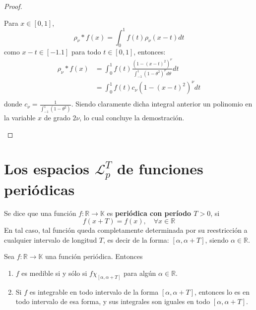 \documentclass[12pt]{report}
\theoremstyle{largebreak}
\newcommand\cf[3]{\ensuremath{#1:#2\rightarrow#3}}
\begin{document}
\begin{proof}
\begin{enumerate}
            Para $x\in[0,1]$,
            \begin{equation*}
                \rho_\nu*f(x)=\int_0^1f(t)\rho_\nu(x-t)dt
            \end{equation*}
            como $x-t\in[-1.1]$ para todo $t\in[0,1]$, entonces:
            \begin{equation*}
                \begin{split}
                    \rho_\nu*f(x)&=\int_0^1f(t)\frac{(1-(x-t)^2)^\nu}{\int_{-1}^1(1-\theta^2)^\nu d\theta}dt\\
                    &=\int_0^1f(t)c_\nu(1-(x-t)^2)^\nu dt\\
                \end{split}
            \end{equation*}
            donde $c_\nu=\frac{1}{\int_{-1}^1(1-\theta^2)}$. Siendo claramente dicha integral anterior un polinomio en la variable $x$ de grado $2\nu$, lo cual concluye la demostración.
        \end{enumerate}
    \end{proof}

    \section{Los espacios $\mathcal{L}_p^T$ de funciones periódicas}

    \begin{mydef}
        Se dice que una función $\cf{f}{\mathbb{R}}{\mathbb{K}}$ es \textbf{periódica con período $T>0$}, si
        \begin{equation*}
            f(x+T)=f(x),\quad\forall x\in\mathbb{R}
        \end{equation*}
        En tal caso, tal función queda completamente determinada por su reestricción a cualquier intervalo de longitud $T$, es decir de la forma: $\left[\alpha,\alpha+T \right]$, siendo $\alpha\in\mathbb{R}$.
    \end{mydef}

    \begin{obs}
        Sea $\cf{f}{\mathbb{R}}{\mathbb{K}}$ una función periódica. Entonces
        \begin{enumerate}
            \item $f$ es medible si y sólo si $f\chi_{\left[\alpha,\alpha+T \right]}$ para algún $\alpha\in\mathbb{R}$.
            \item Si $f$ es integrable en todo intervalo de la forma $\left[\alpha,\alpha+T \right]$, entonces lo es en todo intervalo de esa forma, y sus integrales son iguales en todo $\left[\alpha,\alpha+T \right]$.
        \end{enumerate}
    \end{obs}
\end{document}
